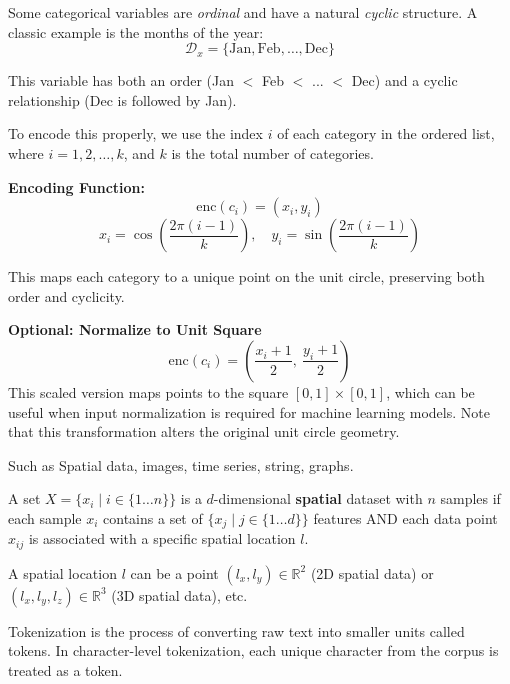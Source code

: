 \documentclass{article}
\begin{document}
Some categorical variables are \textit{ordinal} and have a natural \textit{cyclic} structure. A classic example is the months of the year:
\[
\mathcal{D}_x = \{\text{Jan}, \text{Feb}, \dots, \text{Dec}\}
\]

This variable has both an order (Jan $<$ Feb $<$ ... $<$ Dec) and a cyclic relationship (Dec is followed by Jan).

To encode this properly, we use the index \( i \) of each category in the ordered list, where \( i = 1, 2, \dots, k \), and \( k \) is the total number of categories.

\textbf{Encoding Function:}
\[
\text{enc}(c_i) = (x_i, y_i)
\]
\[
x_i = \cos\left(\frac{2\pi(i-1)}{k}\right),\quad y_i = \sin\left(\frac{2\pi(i-1)}{k}\right)
\]

This maps each category to a unique point on the unit circle, preserving both order and cyclicity.

\textbf{Optional: Normalize to Unit Square}
\[
\text{enc}(c_i) = \left(\frac{x_i + 1}{2},\ \frac{y_i + 1}{2}\right)
\]
This scaled version maps points to the square $[0, 1] \times [0, 1]$, which can be useful when input normalization is required for machine learning models. Note that this transformation alters the original unit circle geometry.


Such as Spatial data, images, time series, string, graphs.

A set $X = \{x_i \mid i \in \{1 \dots n\}\}$ is a $d$-dimensional \textbf{spatial} dataset with $n$ samples if each sample $x_i$ contains a set of $\{ x_j \mid j \in \{ 1 \dots d\} \}$  features AND each data point $x_{ij}$ is associated with a specific spatial location $l$.

A spatial location $l$ can be a point $(l_x, l_y) \in \mathbb{R}^2$ (2D spatial data) or $(l_x, l_y, l_z) \in \mathbb{R}^3$ (3D spatial data), etc.


Tokenization is the process of converting raw text into smaller units called tokens. In character-level tokenization, each unique character from the corpus is treated as a token.
\end{document}
